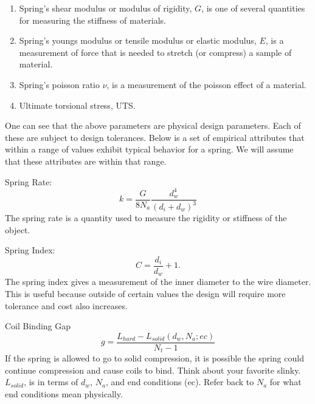 \documentclass[10pt]{article}
\begin{document}
\begin{enumerate}
			
			\item Spring's shear modulus or modulus of rigidity, $G$, is one of several quantities for measuring the stiffness of materials.
			
			\item Spring's youngs modulus or tensile modulus or elastic modulus, $E$, is a measurement of force that is needed  to stretch (or compress) a sample of material.
			
			\item Spring's poisson ratio $\nu$, is a measurement of the poisson effect of a material. 
			
			\item Ultimate torsional stress, UTS. 
		
		\end{enumerate}
		
One can see that the above parameters are physical design parameters. Each of these are subject to design tolerances. Below is a set of empirical attributes that within a range of values exhibit typical behavior for a spring. We will assume that these attributes are within that range. 
		
			Spring Rate:\begin{equation} k = \frac{G}{8N_{a}}\frac{d_{w}^{4}}{(d_{i} + d_{w})^{3}}\end{equation}
			The spring rate is a quantity used to measure the rigidity or stiffness of the object. 
				
			Spring Index:\begin{equation}C = \frac{d_{i}}{d_{w}} + 1.\end{equation}
				 The spring index gives a measurement of the inner diameter to the wire diameter. This is useful because outside of certain values the design will require more tolerance and cost also increases. \cite{SpringIndex}
				
			Coil Binding Gap\begin{equation} g = \frac{L_{hard} - L_{solid}(d_{w},N_{a}; ec)}{N_{t} - 1}\end{equation}
				If the spring is allowed to go to solid compression, it is possible the spring could continue compression and cause coils to bind. Think about your favorite slinky. $L_{solid}$, is in terms of $d_{w}$, $N_{a}$, and end conditions (ec). Refer back to $N_{a}$ for what end conditions mean physically.
		
\end{document}
